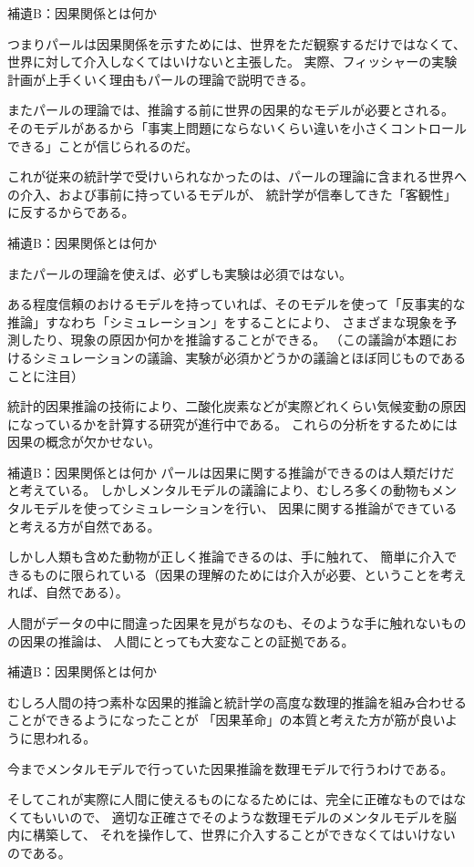 \documentclass[12pt, unicode]{beamer}
\begin{document}
\begin{frame}{補遺B：因果関係とは何か}

つまりパールは因果関係を示すためには、世界をただ観察するだけではなくて、世界に対して介入しなくてはいけないと主張した。
実際、フィッシャーの実験計画が上手くいく理由もパールの理論で説明できる。

またパールの理論では、推論する前に世界の因果的なモデルが必要とされる。
そのモデルがあるから「事実上問題にならないくらい違いを小さくコントロールできる」ことが信じられるのだ。

これが従来の統計学で受けいられなかったのは、パールの理論に含まれる世界への介入、および事前に持っているモデルが、
統計学が信奉してきた「客観性」に反するからである。

\end{frame}

\begin{frame}{補遺B：因果関係とは何か}

またパールの理論を使えば、必ずしも実験は必須ではない。

ある程度信頼のおけるモデルを持っていれば、そのモデルを使って「反事実的な推論」すなわち「シミュレーション」をすることにより、
さまざまな現象を予測したり、現象の原因か何かを推論することができる。
（この議論が本題におけるシミュレーションの議論、実験が必須かどうかの議論とほぼ同じものであることに注目）

統計的因果推論の技術により、二酸化炭素などが実際どれくらい気候変動の原因になっているかを計算する研究が進行中である。
これらの分析をするためには因果の概念が欠かせない。

\end{frame}

\begin{frame}{補遺B：因果関係とは何か}
パールは因果に関する推論ができるのは人類だけだと考えている。
しかしメンタルモデルの議論により、むしろ多くの動物もメンタルモデルを使ってシミュレーションを行い、
因果に関する推論ができていると考える方が自然である。

しかし人類も含めた動物が正しく推論できるのは、手に触れて、
簡単に介入できるものに限られている（因果の理解のためには介入が必要、ということを考えれば、自然である）。

人間がデータの中に間違った因果を見がちなのも、そのような手に触れないものの因果の推論は、
人間にとっても大変なことの証拠である。

\end{frame}

\begin{frame}{補遺B：因果関係とは何か}

むしろ人間の持つ素朴な因果的推論と統計学の高度な数理的推論を組み合わせることができるようになったことが
「因果革命」の本質と考えた方が筋が良いように思われる。

今までメンタルモデルで行っていた因果推論を数理モデルで行うわけである。

そしてこれが実際に人間に使えるものになるためには、完全に正確なものではなくてもいいので、
適切な正確さでそのような数理モデルのメンタルモデルを脳内に構築して、
それを操作して、世界に介入することができなくてはいけないのである。

\end{frame}
  
\end{document}
